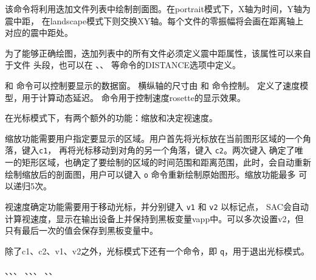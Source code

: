 该命令将利用迭加文件列表中绘制剖面图。在portrait模式下，X轴为时间，Y轴为震中距，
在landscape模式下则交换XY轴。每个文件的零振幅将会画在距离轴上对应的震中距处。

为了能够正确绘图，迭加列表中的所有文件必须定义震中距属性，该属性可以来自于文件
头段，也可以在 、、
等命令的DISTANCE选项中定义。

 和  命令可以控制要显示的数据窗。
横纵轴的尺寸由  和  命令控制。
 定义了速度模型，用于计算动态延迟。
 命令用于控制速度rosette的显示效果。

在光标模式下，有两个额外的功能：缩放和决定视速度。

缩放功能需要用户指定要显示的区域。用户首先将光标放在当前图形区域的一个角落，键入\texttt{c1}，
再将光标移动到对角的另一个角落，键入 \texttt{c2}。两次键入
确定了唯一的矩形区域，也确定了要绘制的区域的时间范围和距离范围，此时，会自动重新
绘制缩放后的剖面图，用户可以键入 \texttt{o} 命令重新绘制原始图形。缩放功能最多
可以递归5次。

视速度确定功能需要用于移动光标，并分别键入 \texttt{v1} 和 \texttt{v2} 以标记点，
SAC会自动计算视速度，显示在输出设备上并保持到黑板变量vapp中。可以多次设置v2，但
只有最后一次的值会保存到黑板变量中。

除了c1、c2、v1、v2之外，光标模式下还有一个命令，即 \texttt{q}，用于退出光标模式。

、、、
、、、
、、